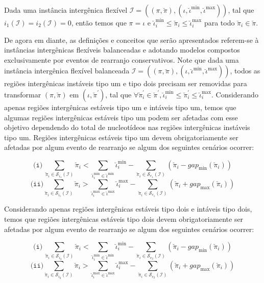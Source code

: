 \begin{remark}\label{remark:EUSNDMWS}
Dada uma instância intergênica flexível $\mathcal{I} = ((\pi,\breve\pi),(\iota,\breve\iota^{\min},\breve\iota^{\max}))$, tal que $i_1(\mathcal{I}) = i_2(\mathcal{I}) = 0$, então temos que $\pi = \iota$ e $\breve\iota^{\min}_i \le \breve\pi_i \le \breve\iota^{\max}_i$ para todo $\breve\pi_i \in \breve\pi$.
\end{remark}

De agora em diante, as definições e conceitos que serão apresentados referem-se à instâncias intergênicas flexíveis balanceadas e adotando modelos compostos exclusivamente por eventos de rearranjo conservativos. Note que dada uma instância intergênica flexível balanceada $\mathcal{I} = ((\pi,\breve\pi),(\iota,\breve\iota^{\min},\breve\iota^{\max}))$, todos as regiões intergênicas instáveis tipo um e tipo dois precisam ser removidas para transformar $(\pi,\breve\pi)$ em $(\iota,\breve\pi^{\prime})$, tal que $\forall \breve\pi^{\prime}_i \in \breve\pi^{\prime}, \breve\iota^{\min}_i \le \breve\pi^{\prime}_i \le \breve\iota^{\max}_i$. Considerando apenas regiões intergênicas estáveis tipo um e intáveis tipo um, temos que algumas regiões intergênicas estáveis tipo um podem ser afetadas com esse objetivo dependendo do total de nucleotídeos nas regiões intergênicas instáveis tipo um. Regiões intergênicas estáveis tipo um devem obrigatoriamente ser afetadas por algum evento de rearranjo se algum dos seguintes cenários ocorrer:

$$\texttt{(i)}~\sum_{\breve\pi_i \in \mathcal{S}_{i_{1}}(\mathcal{I})} \breve\pi_i < \sum_{\breve\iota_{i}^{\min}  \in \breve\iota^{\min}} \breve\iota_{i}^{\min} - \sum_{\breve\pi_i \in \mathcal{S}_{e_{1}}(\mathcal{I})} (\breve\pi_i - gap_{\min}(\breve\pi_i))$$
$$\texttt{(ii)}\sum_{\breve\pi_i \in \mathcal{S}_{i_{1}}(\mathcal{I})} \breve\pi_i > \sum_{\breve\iota_{i}^{\max}  \in \breve\iota^{\max}} \breve\iota_{i}^{\max} - \sum_{\breve\pi_i \in \mathcal{S}_{e_{1}}(\mathcal{I})} (\breve\pi_i + gap_{\max}(\breve\pi_i))$$

Considerando apenas regiões intergênicas estáveis tipo dois e intáveis tipo dois, temos que regiões intergênicas estáveis tipo dois devem obrigatoriamente ser afetadas por algum evento de rearranjo se algum dos seguintes cenários ocorrer:

$$\texttt{(i)}~\sum_{\breve\pi_i \in \mathcal{S}_{i_{2}}(\mathcal{I})} \breve\pi_i < \sum_{\breve\iota_{i}^{\min}  \in \breve\iota^{\min}} \breve\iota_{i}^{\min} - \sum_{\breve\pi_i \in \mathcal{S}_{e_{2}}(\mathcal{I})} (\breve\pi_i - gap_{\min}(\breve\pi_i))$$
$$\texttt{(ii)}\sum_{\breve\pi_i \in \mathcal{S}_{i_{2}}(\mathcal{I})} \breve\pi_i > \sum_{\breve\iota_{i}^{\max}  \in \breve\iota^{\max}} \breve\iota_{i}^{\max} - \sum_{\breve\pi_i \in \mathcal{S}_{e_{2}}(\mathcal{I})} (\breve\pi_i + gap_{\max}(\breve\pi_i))$$

